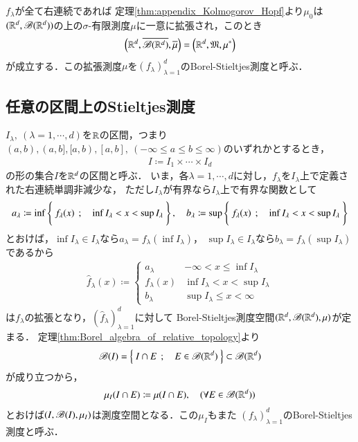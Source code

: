 	$f_\lambda$が全て右連続であれば
	定理\ref{thm:appendix_Kolmogorov_Hopf}より$\mu_0$は
	$(\mathbb{R}^d,\mathscr{B}(\mathbb{R}^d))$の上の$\sigma$-有限測度$\mu$に一意に拡張され，このとき
	\begin{align}
		\left(\mathbb{R}^d,\overline{\mathscr{B}(\mathbb{R}^d)},\overline{\mu}\right) 
		= \left(\mathbb{R}^d,\mathfrak{M},\mu^*\right)
	\end{align}
	が成立する．この拡張測度$\mu$を$(f_\lambda)_{\lambda=1}^d$のBorel-Stieltjes測度と呼ぶ．
	
\subsection{任意の区間上のStieltjes測度}
	$I_\lambda,\ (\lambda=1,\cdots,d)$を$\mathbb{R}$の区間，つまり
	$(a,b),(a,b],[a,b),[a,b],\ (-\infty \leq a \leq b \leq \infty)$のいずれかとするとき，
	\begin{align}
		I \coloneqq I_1 \times \cdots \times I_d
	\end{align}
	の形の集合$I$を$\mathbb{R}^d$の区間と呼ぶ．
	いま，各$\lambda=1,\cdots,d$に対し，$f_\lambda$を$I_\lambda$上で定義された右連続単調非減少な，
	ただし$I_\lambda$が有界なら$I_\lambda$上で有界な関数として
	\begin{align}
		a_\lambda \coloneqq \operatorname*{inf}_{} \left\{\ f_\lambda(x)\ \, ; \quad \operatorname*{inf}_{} I_\lambda < x < \operatorname*{sup}_{} I_\lambda\ \right\},
		\quad b_\lambda \coloneqq \operatorname*{sup}_{} \left\{\ f_\lambda(x)\ \, ; \quad \operatorname*{inf}_{} I_\lambda < x < \operatorname*{sup}_{} I_\lambda\ \right\}
	\end{align}
	とおけば，$\inf{}{I_\lambda} \in I_\lambda$なら$a_\lambda = f_\lambda(\inf{}{I_\lambda})$，
	$\sup{}{I_\lambda} \in I_\lambda$なら$b_\lambda = f_\lambda(\sup{}{I_\lambda})$であるから
	\begin{align}
		\hat{f}_\lambda(x) \coloneqq 
		\begin{cases}
			a_\lambda & -\infty < x \leq \inf{}{I_\lambda} \\
			f_\lambda(x) & \inf{}{I_\lambda} < x < \sup{}{I_\lambda} \\
			b_\lambda & \sup{}{I_\lambda} \leq x < \infty
		\end{cases}
	\end{align}
	は$f_\lambda$の拡張となり，$\left( \hat{f}_\lambda \right)_{\lambda=1}^d$に対して
	Borel-Stieltjes測度空間$(\mathbb{R}^d,\mathscr{B}(\mathbb{R}^d),\mu)$が定まる．
	定理\ref{thm:Borel_algebra_of_relative_topology}より
	\begin{align}
		\mathscr{B}(I) = \left\{\ I \cap E\ \, ; \quad E \in \mathscr{B}(\mathbb{R}^d)\ \right\} \subset \mathscr{B}(\mathbb{R}^d)
	\end{align}
	が成り立つから，
	\begin{align}
		\mu_I(I \cap E) \coloneqq \mu(I \cap E),
		\quad (\forall E \in \mathscr{B}(\mathbb{R}^d))
	\end{align}
	とおけば$(I,\mathscr{B}(I),\mu_I)$は測度空間となる．この$\mu_I$もまた
	$(f_\lambda)_{\lambda=1}^d$のBorel-Stieltjes測度と呼ぶ．
	
